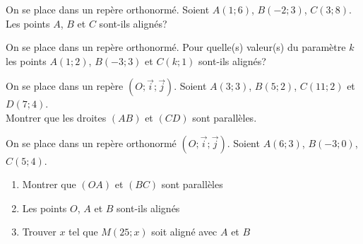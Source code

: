 \begin{exercice}
On se place dans un repère orthonormé. Soient $A(1;6)$, $B(-2;3)$, $C(3;8)$.\\

Les points $A$, $B$ et $C$ sont-ils alignés?
\end{exercice}

\begin{exercice}
On se place dans un repère orthonormé. Pour quelle(s) valeur(s) du paramètre $k$ les points $A(1;2)$, $B(-3;3)$ et $C(k;1)$ sont-ils alignés?
\end{exercice}

\begin{exercice}
On se place dans un repère $(O;\vec{i};\vec{j})$. Soient $A(3;3)$, $B(5;2)$, $C(11;2)$ et $D(7;4)$.\\
Montrer que les droites $(AB)$ et $(CD)$ sont parallèles.
\end{exercice}

\begin{exercice}
On se place dans un repère orthonormé $(O;\vec{i};\vec{j})$. Soient $A(6;3)$, $B(-3;0)$, $C(5;4)$.\\
\begin{enumerate}
\item Montrer que $(OA)$ et $(BC)$ sont parallèles
\item Les points $O$, $A$ et $B$ sont-ils alignés
\item Trouver $x$ tel que $M(25;x)$ soit aligné avec $A$ et $B$
\end{enumerate}
\end{exercice}

